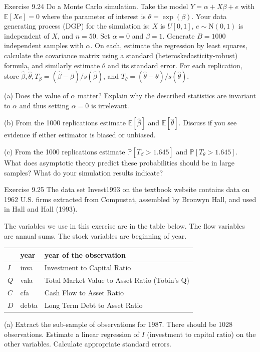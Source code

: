 \documentclass[10pt]{article}
\begin{document}
Exercise 9.24 Do a Monte Carlo simulation. Take the model $Y=\alpha+X \beta+e$ with $\mathbb{E}[X e]=0$ where the parameter of interest is $\theta=\exp (\beta)$. Your data generating process (DGP) for the simulation is: $X$ is $U[0,1]$, $e \sim \mathrm{N}(0,1)$ is independent of $X$, and $n=50$. Set $\alpha=0$ and $\beta=1$. Generate $B=1000$ independent samples with $\alpha$. On each, estimate the regression by least squares, calculate the covariance matrix using a standard (heteroskedasticity-robust) formula, and similarly estimate $\theta$ and its standard error. For each replication, store $\widehat{\beta}, \widehat{\theta}, T_{\beta}=(\widehat{\beta}-\beta) / s(\widehat{\beta})$, and $T_{\theta}=(\widehat{\theta}-\theta) / s(\widehat{\theta})$.

(a) Does the value of $\alpha$ matter? Explain why the described statistics are invariant to $\alpha$ and thus setting $\alpha=0$ is irrelevant.

(b) From the 1000 replications estimate $\mathbb{E}[\widehat{\beta}]$ and $\mathbb{E}[\widehat{\theta}]$. Discuss if you see evidence if either estimator is biased or unbiased.

(c) From the 1000 replications estimate $\mathbb{P}\left[T_{\beta}>1.645\right]$ and $\mathbb{P}\left[T_{\theta}>1.645\right]$. What does asymptotic theory predict these probabilities should be in large samples? What do your simulation results indicate?

Exercise 9.25 The data set Invest1993 on the textbook website contains data on 1962 U.S. firms extracted from Compustat, assembled by Bronwyn Hall, and used in Hall and Hall (1993).

The variables we use in this exercise are in the table below. The flow variables are annual sums. The stock variables are beginning of year.

\begin{tabular}{|l|l|l|}
\hline
 & year & year of the observation \\
\hline
$I$ & inva & Investment to Capital Ratio \\
\hline
$Q$ & vala & Total Market Value to Asset Ratio (Tobin's Q) \\
\hline
$C$ & cfa & Cash Flow to Asset Ratio \\
\hline
$D$ & debta & Long Term Debt to Asset Ratio \\
\hline
\end{tabular}

(a) Extract the sub-sample of observations for 1987. There should be 1028 observations. Estimate a linear regression of $I$ (investment to capital ratio) on the other variables. Calculate appropriate standard errors.
\end{document}
